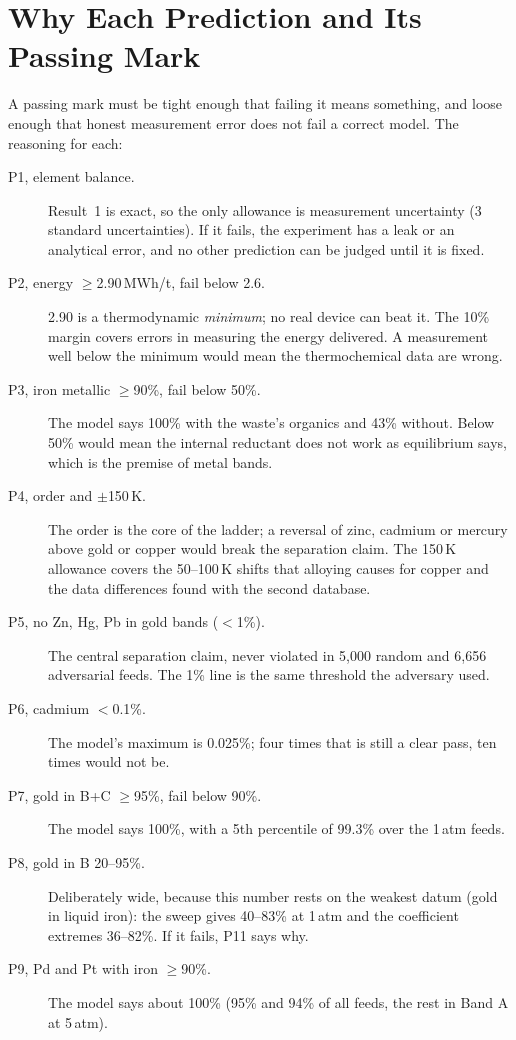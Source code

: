 \documentclass[11pt,a4paper]{article}
\begin{document}
\section{Why Each Prediction and Its Passing Mark}\label{ch:prereg}
A passing mark must be tight enough that failing it means something, and loose enough that honest measurement error does not fail a correct model. The reasoning for each:
\begin{description}
\item[P1, element balance.] Result~1 is exact, so the only allowance is measurement uncertainty (3 standard uncertainties). If it fails, the experiment has a leak or an analytical error, and no other prediction can be judged until it is fixed.
\item[P2, energy $\ge$2.90\,MWh/t, fail below 2.6.] 2.90 is a thermodynamic \emph{minimum}; no real device can beat it. The 10\% margin covers errors in measuring the energy delivered. A measurement well below the minimum would mean the thermochemical data are wrong.
\item[P3, iron metallic $\ge$90\%, fail below 50\%.] The model says 100\% with the waste's organics and 43\% without. Below 50\% would mean the internal reductant does not work as equilibrium says, which is the premise of metal bands.
\item[P4, order and $\pm$150\,K.] The order is the core of the ladder; a reversal of zinc, cadmium or mercury above gold or copper would break the separation claim. The 150\,K allowance covers the 50--100\,K shifts that alloying causes for copper and the data differences found with the second database.
\item[P5, no Zn, Hg, Pb in gold bands ($<$1\%).] The central separation claim, never violated in 5,000 random and 6,656 adversarial feeds. The 1\% line is the same threshold the adversary used.
\item[P6, cadmium $<$0.1\%.] The model's maximum is 0.025\%; four times that is still a clear pass, ten times would not be.
\item[P7, gold in B+C $\ge$95\%, fail below 90\%.] The model says 100\%, with a 5th percentile of 99.3\% over the 1\,atm feeds.
\item[P8, gold in B 20--95\%.] Deliberately wide, because this number rests on the weakest datum (gold in liquid iron): the sweep gives 40--83\% at 1\,atm and the coefficient extremes 36--82\%. If it fails, P11 says why.
\item[P9, Pd and Pt with iron $\ge$90\%.] The model says about 100\% (95\% and 94\% of all feeds, the rest in Band A at 5\,atm).

\end{description}
\end{document}
